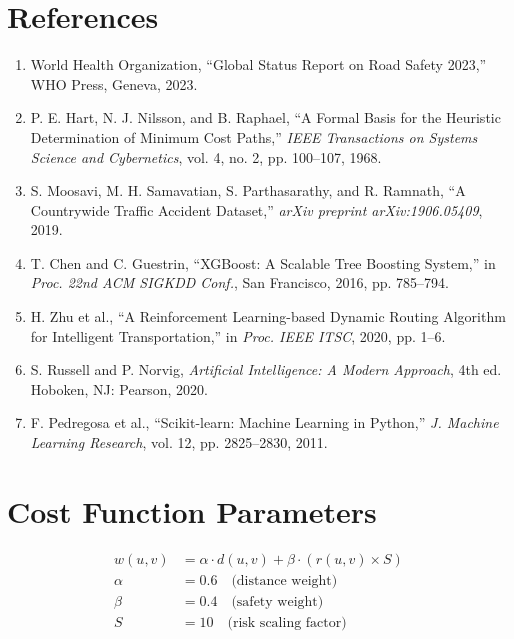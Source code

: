 \documentclass[12pt,a4paper]{report}
\begin{document}
\chapter*{References}

\begin{enumerate}
\item World Health Organization, ``Global Status Report on Road Safety 2023,'' WHO Press, Geneva, 2023.
\item P. E. Hart, N. J. Nilsson, and B. Raphael, ``A Formal Basis for the Heuristic Determination of Minimum Cost Paths,'' \textit{IEEE Transactions on Systems Science and Cybernetics}, vol. 4, no. 2, pp. 100--107, 1968.
\item S. Moosavi, M. H. Samavatian, S. Parthasarathy, and R. Ramnath, ``A Countrywide Traffic Accident Dataset,'' \textit{arXiv preprint arXiv:1906.05409}, 2019.
\item T. Chen and C. Guestrin, ``XGBoost: A Scalable Tree Boosting System,'' in \textit{Proc. 22nd ACM SIGKDD Conf.}, San Francisco, 2016, pp. 785--794.
\item H. Zhu et al., ``A Reinforcement Learning-based Dynamic Routing Algorithm for Intelligent Transportation,'' in \textit{Proc. IEEE ITSC}, 2020, pp. 1--6.
\item S. Russell and P. Norvig, \textit{Artificial Intelligence: A Modern Approach}, 4th ed. Hoboken, NJ: Pearson, 2020.
\item F. Pedregosa et al., ``Scikit-learn: Machine Learning in Python,'' \textit{J. Machine Learning Research}, vol. 12, pp. 2825--2830, 2011.
\end{enumerate}


\appendix

\chapter{Cost Function Parameters}
\begin{align}
w(u,v) &= \alpha \cdot d(u,v) + \beta \cdot (r(u,v) \times S) \nonumber \\
\alpha &= 0.6 \quad \text{(distance weight)} \nonumber \\
\beta  &= 0.4 \quad \text{(safety weight)} \nonumber \\
S      &= 10  \quad \text{(risk scaling factor)} \nonumber
\end{align}
\end{document}
